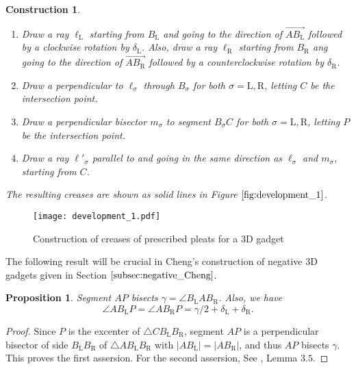 \documentclass[11pt]{amsart}
\newtheorem{proposition}[theorem]{Proposition}
\newtheorem{construction}[theorem]{Construction}
\numberwithin{equation}{section}
\numberwithin{theorem}{section}
\newcommand{\Lt}{\ensuremath{\mathrm{L}}}
\newcommand{\Rt}{\ensuremath{\mathrm{R}}}
\newcommand{\norm}[1]{\ensuremath{\left| #1 \right|}}
\newcommand{\ora}[1]{\ensuremath{\overrightarrow{#1}}}
\begin{document}
\begin{construction}
\begin{enumerate}[(1)]
\item Draw a ray $\ell_\Lt$ starting from $B_\Lt$ and going to the direction of $\ora{AB_\Lt}$ followed by a clockwise rotation by $\delta_\Lt$.
Also, draw a ray $\ell_\Rt$ starting from $B_\Rt$ ang going to the direction of $\ora{AB_\Rt}$ followed by a counterclockwise rotation by $\delta_\Rt$.
\item Draw a perpendicular to $\ell_\sigma$ through $B_\sigma$ for both $\sigma =\Lt ,\Rt$, letting $C$ be the intersection point. 
\item Draw a perpendicular bisector $m_\sigma$ to segment $B_\sigma C$ for both $\sigma =\Lt ,\Rt$, letting $P$ be the intersection point. 
\item Draw a ray $\ell'_\sigma$ parallel to and going in the same direction as $\ell_\sigma$ and $m_\sigma$, starting from $C$. 
\end{enumerate}
The resulting creases are shown as solid lines in Figure $\ref{fig:development_1}$.
\end{construction}
\begin{figure}[htbp]
\addtocounter{theorem}{1}
\centering\texttt{[image: development\_1.pdf]}
    \caption{Construction of creases of prescribed pleats for a $3$D gadget}
    \label{fig:development_1}
\end{figure}
The following result will be crucial in Cheng's construction of negative $3$D gadgets given in Section $\ref{subsec:negative_Cheng}$.
\begin{proposition}\label{prop:AP}
Segment $AP$ bisects $\gamma =\angle B_\Lt AB_\Rt$.
Also, we have
\begin{equation*}
\angle AB_\Lt P=\angle AB_\Rt P=\gamma /2 +\delta_\Lt +\delta_\Rt .
\end{equation*}
\end{proposition}
\begin{proof}
Since $P$ is the excenter of $\triangle CB_\Lt B_\Rt$, segment $AP$ is a perpendicular bisector of side $B_\Lt B_\Rt$ of $\triangle AB_\Lt B_\Rt$
with $\norm{AB_\Lt}=\norm{AB_\Rt}$, and thus $AP$ bisects $\gamma$.
This proves the first assersion.
For the second assersion, See \cite{Doi20}, Lemma $3.5$.
\end{proof}
\end{document}
